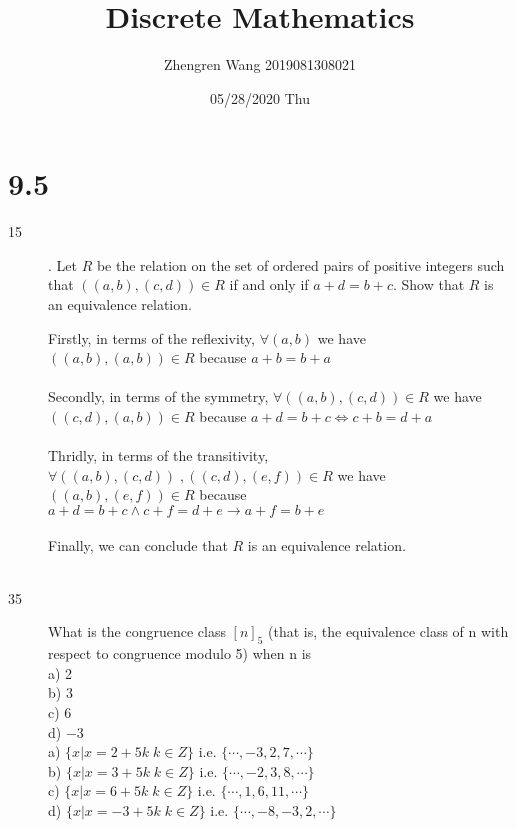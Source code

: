 \documentclass[UTF8]{article}
\title{Discrete Mathematics}
\author{Zhengren Wang 2019081308021}
\date{05/28/2020 Thu }
\begin{document}
\maketitle

\part{9.5}
\begin{description}
    \item[15]. Let $R$ be the relation on the set of ordered pairs of positive integers such that $((a, b),(c, d))\in R$ if and only if $a+d=b+c$. Show that $R$ is an equivalence relation.

        Firstly, in terms of the reflexivity, $\forall (a,b)$ we have $((a,b),(a,b)) \in R$ because $a+b=b+a$                                                            \\  \\
        Secondly, in terms of the symmetry, $\forall ((a,b),(c,d)) \in R$ we have $((c,d),(a,b)) \in R$ because $a+d=b+c \Leftrightarrow c+b=d+a$                        \\  \\
        Thridly, in terms of the transitivity, $\forall ((a,b),(c,d))\; , ((c,d),(e,f)) \in R$ we have $((a,b),(e,f)) \in R$ because $a+d=b+c \land c+f=d+e \to a+f=b+e$ \\  \\
        Finally, we can conclude that $R$ is an equivalence relation.                                                                                                    \\  \\

    \item[35]What is the congruence class $[n]_5$ (that is, the equivalence class of n with respect to congruence modulo 5) when n is \\

            a) 2  \\
            b) 3  \\
            c) 6  \\
            d) −3 \\

        
            a) $\{ x| x=2+5k \; k \in Z   \}$  i.e. $\{ \cdots,-3,2,7,\cdots \}$\\
            b) $\{ x| x=3+5k \; k \in Z   \}$  i.e. $\{ \cdots,-2,3,8,\cdots \}$\\
            c) $\{ x| x=6+5k \; k \in Z   \}$  i.e. $\{ \cdots,1,6,11,\cdots \}$\\
            d) $\{ x| x=-3+5k \; k \in Z   \}$  i.e. $\{ \cdots,-8,-3,2,\cdots \}$\\
\end{description}
\end{document}
